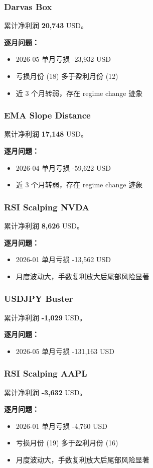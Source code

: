\documentclass[11pt,a4paper]{ctexart}
\begin{document}
\subsubsection{Darvas Box}
累计净利润 \textbf{20,743} USD。\par\noindent\textbf{逐月问题：}\begin{itemize}\setlength\itemsep{2pt}
\item 2026-05 单月亏损 -23,932 USD\item 亏损月份 (18) 多于盈利月份 (12)\item 近 3 个月转弱，存在 regime change 迹象\end{itemize}
\subsubsection{EMA Slope Distance}
累计净利润 \textbf{17,148} USD。\par\noindent\textbf{逐月问题：}\begin{itemize}\setlength\itemsep{2pt}
\item 2026-04 单月亏损 -59,622 USD\item 近 3 个月转弱，存在 regime change 迹象\end{itemize}
\subsubsection{RSI Scalping NVDA}
累计净利润 \textbf{8,626} USD。\par\noindent\textbf{逐月问题：}\begin{itemize}\setlength\itemsep{2pt}
\item 2026-01 单月亏损 -13,562 USD\item 月度波动大，手数复利放大后尾部风险显著\end{itemize}
\subsubsection{USDJPY Buster}
累计净利润 \textbf{-1,029} USD。\par\noindent\textbf{逐月问题：}\begin{itemize}\setlength\itemsep{2pt}
\item 2026-05 单月亏损 -131,163 USD\end{itemize}
\subsubsection{RSI Scalping AAPL}
累计净利润 \textbf{-3,632} USD。\par\noindent\textbf{逐月问题：}\begin{itemize}\setlength\itemsep{2pt}
\item 2026-01 单月亏损 -4,760 USD\item 亏损月份 (19) 多于盈利月份 (16)\item 月度波动大，手数复利放大后尾部风险显著\end{itemize}
\end{document}
